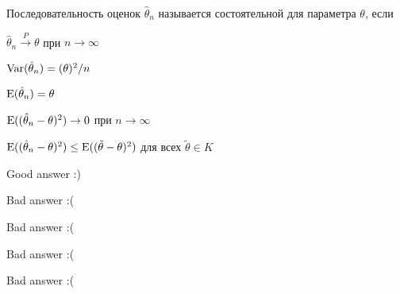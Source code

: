 
\begin{question}
Последовательность оценок \(\hat \theta_n\) называется состоятельной для
параметра \(\theta\), если
\begin{answerlist}[2]
  \item \(\hat \theta_n \stackrel{P}{\to} \theta\) при
\(n\stackrel{}{\to} \infty\)
  \item \(\operatorname{Var}(\hat \theta_n)=(\theta)^2/n\)
  \item \(\operatorname{E}(\hat \theta_n)=\theta\)
  \item \(\operatorname{E}((\hat \theta_n - \theta)^2) \stackrel{}{\to} 0\) при
\(n\stackrel{}{\to} \infty\)
  \item \(\operatorname{E}((\hat \theta_n - \theta)^2) \leq \operatorname{E}((\tilde \theta - \theta)^2)\)
для всех \(\tilde \theta \in K\)
\end{answerlist}
\end{question}

\begin{solution}
\begin{answerlist}
  \item Good answer :)
  \item Bad answer :(
  \item Bad answer :(
  \item Bad answer :(
  \item Bad answer :(
\end{answerlist}
\end{solution}

